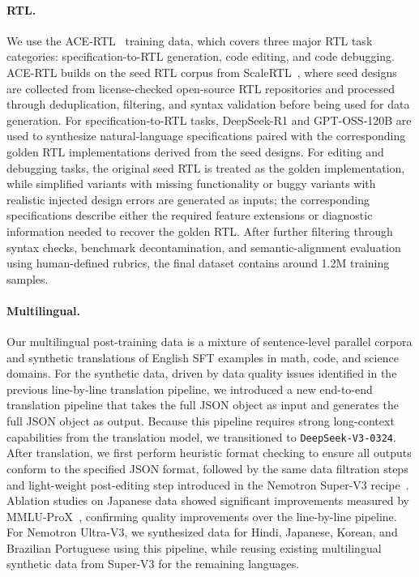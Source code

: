 \paragraph{RTL.}
We use the ACE-RTL~\citep{deng2026ace} training data, which covers three major RTL task categories: specification-to-RTL generation, code editing, and code debugging. ACE-RTL builds on the seed RTL corpus from ScaleRTL~\citep{deng2025scalertl}, where seed designs are collected from license-checked open-source RTL repositories and processed through deduplication, filtering, and syntax validation before being used for data generation. For specification-to-RTL tasks, DeepSeek-R1 and GPT-OSS-120B are used to synthesize natural-language specifications paired with the corresponding golden RTL implementations derived from the seed designs. For editing and debugging tasks, the original seed RTL is treated as the golden implementation, while simplified variants with missing functionality or buggy variants with realistic injected design errors are generated as inputs; the corresponding specifications describe either the required feature extensions or diagnostic information needed to recover the golden RTL. After further filtering through syntax checks, benchmark decontamination, and semantic-alignment evaluation using human-defined rubrics, the final dataset contains around 1.2M training samples.

\paragraph{Multilingual.}
Our multilingual post-training data is a mixture of sentence-level parallel corpora and synthetic translations of English SFT examples in math, code, and science domains.
For the synthetic data, driven by data quality issues identified in the previous line-by-line translation pipeline, we introduced a new end-to-end translation pipeline that takes the full JSON object as input and generates the full JSON object as output.
Because this pipeline requires strong long-context capabilities from the translation model, we transitioned to \texttt{DeepSeek-V3-0324}.
After translation, we first perform heuristic format checking to ensure all outputs conform to the specified JSON format, followed by the same data filtration steps and light-weight post-editing step introduced in the Nemotron Super-V3 recipe~\citep{nvidia2026nemotron3superopen}.
Ablation studies on Japanese data showed significant improvements measured by MMLU-ProX~\citep{xuan2025mmluprox}, confirming quality improvements over the line-by-line pipeline.
For Nemotron Ultra-V3, we synthesized data for Hindi, Japanese, Korean, and Brazilian Portuguese using this pipeline, while reusing existing multilingual synthetic data from Super-V3 for the remaining languages.

